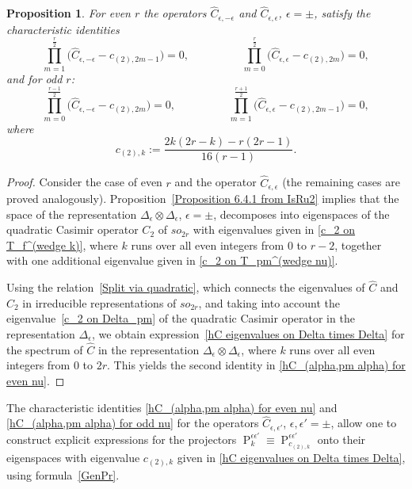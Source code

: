 \documentclass[a4paper]{article}
\newcommand{\hC}{\widehat{C}}
\renewcommand{\=}{\ =\ }
\DeclareMathOperator{\proj}{P}
\numberwithin{equation}{section}
\newtheorem{proposition}{Proposition}
\theoremstyle{remark}
\begin{document}
\begin{proposition}\label{Prop: char identities for hC}
For even $r$ the operators $\hC_{\epsilon,-\epsilon}$ and $\hC_{\epsilon,\epsilon}$, $\epsilon=\pm$, satisfy the characteristic identities
\begin{equation}\label{hC_(alpha,pm alpha) for even nu}
\prod_{m=1}^{\frac{r}{2}}\bigg(\hC_{\epsilon,-\epsilon}-c_{(2),2m-1}\bigg)=0,\hspace{2cm}
\prod_{m=0}^{\frac{r}{2}}\bigg(\hC_{\epsilon,\epsilon}-c_{(2),2m}\bigg)=0,
\end{equation}
and for odd $r$:
\begin{equation}\label{hC_(alpha,pm alpha) for odd nu}
\prod_{m=0}^{\frac{r-1}{2}}\bigg(\hC_{\epsilon,-\epsilon}-c_{(2),2m}\bigg)=0,\hspace{2cm}
\prod_{m=1}^{\frac{r+1}{2}}\bigg(\hC_{\epsilon,\epsilon}-c_{(2),2m-1}\bigg)=0,
\end{equation}
where
\begin{equation}\label{hC eigenvalues on Delta times Delta}
c_{(2),k}:=\frac{2k(2r-k)-r(2r-1)}{16(r-1)}.
\end{equation}
\end{proposition}

\begin{proof}
Consider the case of even $r$ and the operator $\hC_{\epsilon,\epsilon}$ (the remaining cases are proved analogously).
Proposition~\ref{Proposition 6.4.1 from IsRu2} implies that the space of the representation $\Delta_\epsilon\otimes \Delta_{\epsilon}$, $\epsilon=\pm$, decomposes into eigenspaces of the quadratic Casimir operator $C_2$ of $so_{2r}$ with eigenvalues given in \eqref{c_2 on T_f^(wedge k)}, where $k$ runs over all even integers from $0$ to $r-2$, together with one additional eigenvalue given in \eqref{c_2 on T_pm^(wedge nu)}.

Using the relation~\eqref{Split via quadratic}, which connects the eigenvalues of $\hC$ and $C_2$ in irreducible representations of $so_{2r}$, and taking into account the eigenvalue~\eqref{c_2 on Delta_pm} of the quadratic Casimir operator in the representation $\Delta_\epsilon$, we obtain expression~\eqref{hC eigenvalues on Delta times Delta} for the spectrum of $\hC$ in the representation $\Delta_\epsilon\otimes \Delta_{\epsilon}$, where $k$ runs over all even integers from $0$ to $2r$. This yields the second identity in \eqref{hC_(alpha,pm alpha) for even nu}.
\end{proof}

The characteristic identities
\eqref{hC_(alpha,pm alpha) for even nu}
and
\eqref{hC_(alpha,pm alpha) for odd nu}
for the operators $\hC_{\epsilon,\epsilon'}$, $\epsilon,\epsilon'=\pm$,
allow one to construct explicit expressions for the projectors
$\proj_k^{\epsilon\epsilon'}\equiv \proj_{c_{(2),k}}^{\epsilon\epsilon'}$
onto their eigenspaces with eigenvalue $c_{(2),k}$ given in
\eqref{hC eigenvalues on Delta times Delta},
using formula~\eqref{GenPr}.
\end{document}
